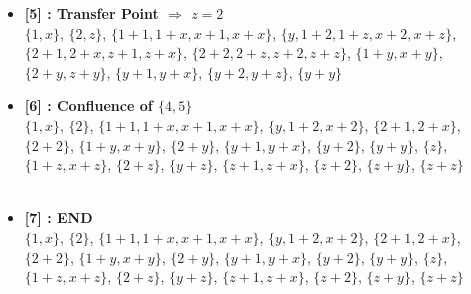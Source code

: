 \begin{itemize}
    \item \textbf{[5] : Transfer Point $\Rightarrow$ $z = 2$}\\
        $\{1, x\}$, $\{2, z\}$, $\{1 + 1, 1 + x, x + 1, x + x\}$, $\{y, 1 + 2, 1 + z, x + 2, x + z\}$, $\{2 + 1, 2 + x, z + 1, z + x\}$, $\{2 + 2, 2 + z, z + 2, z + z\}$, $\{1 + y, x + y\}$, $\{2 + y, z + y\}$, $\{y + 1, y + x\}$, $\{y + 2, y + z\}$, $\{y + y\}$

    \item \textbf{[6] : Confluence of $\{4, 5\}$}\\
        $\{1, x\}$, $\{2\}$, $\{1 + 1, 1 + x, x + 1, x + x\}$, $\{y, 1 + 2, x + 2\}$, $\{2 + 1, 2 + x\}$, $\{2 + 2\}$, $\{1 + y, x + y\}$, $\{2 + y\}$, $\{y + 1, y + x\}$, $\{y + 2\}$, $\{y + y\}$, $\{z\}$, $\{1 + z, x + z\}$, $\{2 + z\}$, $\{y + z\}$, $\{z + 1, z + x\}$, $\{z + 2\}$, $\{z + y\}$, $\{z + z\}$\\
    \\
    \item \textbf{[7] : END}\\
        $\{1, x\}$, $\{2\}$, $\{1 + 1, 1 + x, x + 1, x + x\}$, $\{y, 1 + 2, x + 2\}$, $\{2 + 1, 2 + x\}$, $\{2 + 2\}$, $\{1 + y, x + y\}$, $\{2 + y\}$, $\{y + 1, y + x\}$, $\{y + 2\}$, $\{y + y\}$, $\{z\}$, $\{1 + z, x + z\}$, $\{2 + z\}$, $\{y + z\}$, $\{z + 1, z + x\}$, $\{z + 2\}$, $\{z + y\}$, $\{z + z\}$

\end{itemize}
